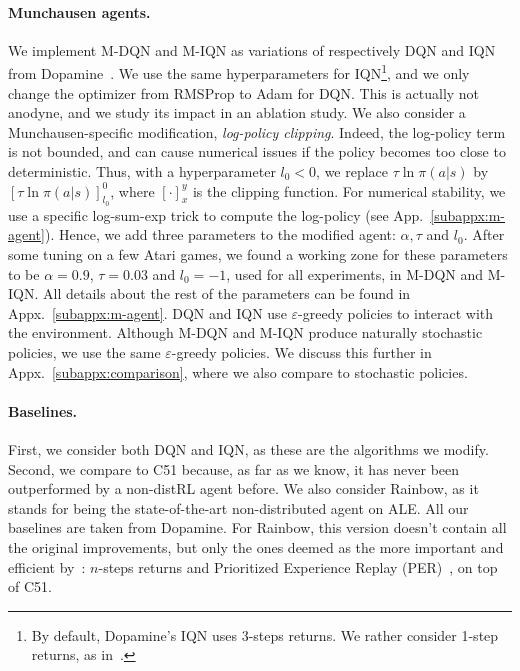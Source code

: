 \documentclass{article}
\begin{document}
\paragraph{Munchausen agents.}
We implement M-DQN and M-IQN as variations of  respectively DQN and IQN from Dopamine~\cite{castro2018dopamine}. We use the same hyperparameters for IQN\footnote{By default, Dopamine's IQN uses 3-steps returns. We rather consider 1-step returns, as in~\cite{dabney2018implicit}.}, and we only change the optimizer from RMSProp to Adam for DQN. This is actually not anodyne, and we study its impact in an ablation study.
We also consider a Munchausen-specific modification, \emph{log-policy clipping}. Indeed, the log-policy term is not bounded, and can cause numerical issues if the policy becomes too close to deterministic. Thus, with a hyperparameter $l_0 <0$, we replace $\tau \ln\pi(a|s)$ by $[\tau \ln\pi(a|s)]_{l_0}^0$, where $[\cdot]_x^y$ is the clipping function. For numerical stability, we use a specific log-sum-exp trick to compute the log-policy (see App.~\ref{subappx:m-agent}). Hence, we add three parameters to the modified agent: $\alpha, \tau$ and $l_0$. After some tuning on a few Atari games, we found a working zone for these parameters to be $\alpha=0.9$, $\tau=0.03$ and $l_0=-1$, used for all experiments, in M-DQN and M-IQN.
All details about the rest of the parameters can be found in  Appx.~\ref{subappx:m-agent}. DQN and IQN use $\varepsilon$-greedy policies to interact with the environment. Although M-DQN and M-IQN produce naturally stochastic policies, we use the same $\varepsilon$-greedy policies.
We discuss this further in Appx.~\ref{subappx:comparison}, where we also compare to stochastic policies.


\paragraph{Baselines.}
First, we consider both DQN and IQN, as these are the algorithms we modify. Second, we compare to C51 because, as far as we know, it has never been outperformed by a non-distRL agent before. We also consider Rainbow, as it stands for being the state-of-the-art non-distributed agent on ALE. All our baselines are taken from Dopamine. For Rainbow, this version doesn't contain all the original improvements, but only the ones deemed as the more important and efficient by~\citet{hessel2018rainbow}: $n$-steps returns and Prioritized Experience Replay (PER)~\citep{schaul2015prioritized}, on top of C51.
\end{document}
